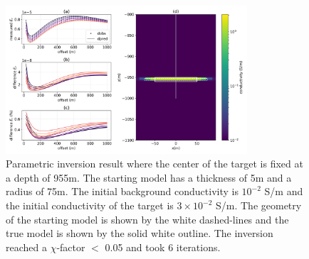 \begin{figure}
    \begin{center}
    \includegraphics[width=0.8\textwidth]{figures/inversion/parametric_voxel2_large_r.png}
    \end{center}
\caption{
    Parametric inversion result where the center of the target is fixed at a depth
    of 955m. The starting model has a thickness of 5m and a radius of 75m. The initial background
    conductivity is $10^{-2}$ S/m and the initial conductivity of the target is $3\times10^{-2}$ S/m.
    The geometry of the starting model is shown by the white dashed-lines and the
    true model is shown by the solid white outline. The inversion reached a $\chi$-factor $<$ 0.05
    and took 6 iterations.
}
\label{fig:parametric_voxel2_large_r}
\end{figure}
